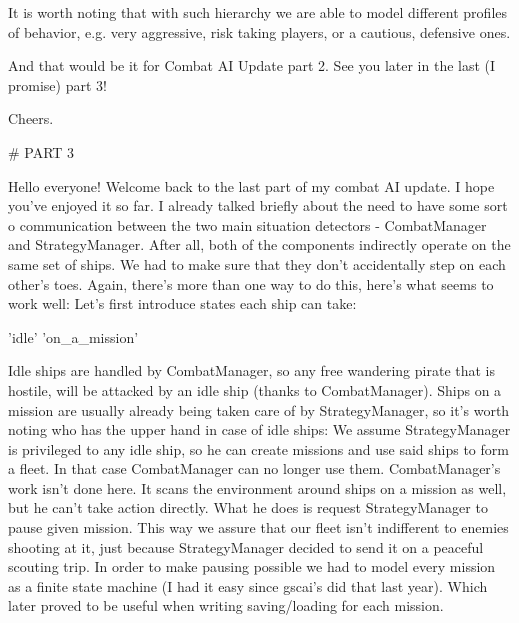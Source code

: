It is worth noting that with such hierarchy we are able to model different profiles of behavior, e.g. very aggressive, risk taking players, or a cautious, defensive ones.

And that would be it for Combat AI Update part 2. 
See you later in the last (I promise) part 3!

Cheers.

# PART 3 

Hello everyone!
Welcome back to the last part of my combat AI update. I hope you've enjoyed it so far.
I already talked briefly about the need to have some sort o communication between the two main situation detectors - CombatManager and StrategyManager. 
After all, both of the components indirectly operate on the same set of ships. 
We had to make sure that they don't accidentally step on each other's toes. 
Again, there's more than one way to do this, here's what seems to work well:
Let's first introduce states each ship can take:

    'idle'
    'on_a_mission'

Idle ships are handled by CombatManager, so any free wandering pirate that is hostile, will be attacked by an idle ship (thanks to CombatManager). 
Ships on a mission are usually already being taken care of by StrategyManager, so it's worth noting who has the upper hand in case of idle ships:
We assume StrategyManager is privileged to any idle ship, so he can create missions and use said ships to form a fleet. 
In that case CombatManager can no longer use them.
CombatManager's work isn't done here. It scans the environment around ships on a mission as well, but he can't take action directly. 
What he does is request StrategyManager to pause given mission. 
This way we assure that our fleet isn't indifferent to enemies shooting at it, just because StrategyManager decided to send it on a peaceful scouting trip. 
In order to make pausing possible we had to model every mission as a finite state machine (I had it easy since gscai's did that last year). 
Which later proved to be useful when writing saving/loading for each mission.


